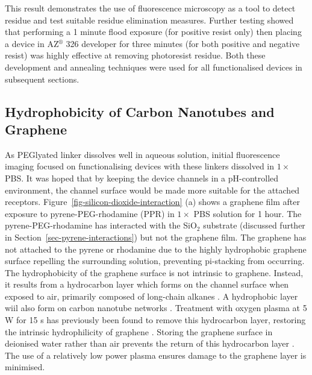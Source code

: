 \documentclass[
  a4paper,
]{scrbook}
\begin{document}
This result demonstrates the use of fluorescence microscopy as a tool to
detect residue and test suitable residue elimination measures. Further
testing showed that performing a 1 minute flood exposure (for positive
resist only) then placing a device in AZ\(^\circledR\) 326 developer for
three minutes (for both positive and negative resist) was highly
effective at removing photoresist residue. Both these development and
annealing techniques were used for all functionalised devices in
subsequent sections.

\hypertarget{sec-hydrophobicity}{%
\subsection{Hydrophobicity of Carbon Nanotubes and
Graphene}\label{sec-hydrophobicity}}

As PEGlyated linker dissolves well in aqueous solution, initial
fluorescence imaging focused on functionalising devices with these
linkers dissolved in \(1 \times\) PBS. It was hoped that by keeping the
device channels in a pH-controlled environment, the channel surface
would be made more suitable for the attached receptors.
Figure~\ref{fig-silicon-dioxide-interaction} (a) shows a graphene film
after exposure to pyrene-PEG-rhodamine (PPR) in \(1 \times\) PBS
solution for 1 hour. The pyrene-PEG-rhodamine has interacted with the
SiO\(_2\) substrate (discussed further in
Section~\ref{sec-pyrene-interactions}) but not the graphene film. The
graphene has not attached to the pyrene or rhodamine due to the highly
hydrophobic graphene surface repelling the surrounding solution,
preventing pi-stacking from occurring. The hydrophobicity of the
graphene surface is not intrinsic to graphene. Instead, it results from
a hydrocarbon layer which forms on the channel surface when exposed to
air, primarily composed of long-chain alkanes
\autocite{Ashraf2014,Palinkas2022}. A hydrophobic layer wiil also form
on carbon nanotube networks \autocite{Stando2019,Park2022}. Treatment
with oxygen plasma at 5 W for 15 s has previously been found to remove
this hydrocarbon layer, restoring the intrinsic hydrophilicity of
graphene \autocite{Shin2010}. Storing the graphene surface in deionised
water rather than air prevents the return of this hydrocarbon layer
\autocite{Ashraf2014}. The use of a relatively low power plasma ensures
damage to the graphene layer is minimised.
\end{document}
